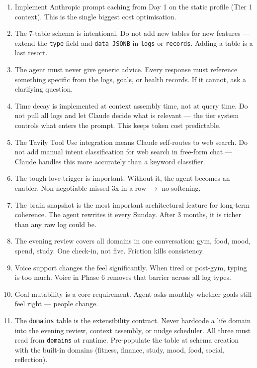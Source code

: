 \documentclass[12pt, a4paper]{article}
\begin{document}
\begin{enumerate}
    \item Implement Anthropic prompt caching from Day 1 on the static profile (Tier 1 context). This is the single biggest cost optimisation.
    \item The 7-table schema is intentional. Do not add new tables for new features --- extend the \texttt{type} field and \texttt{data JSONB} in \texttt{logs} or \texttt{records}. Adding a table is a last resort.
    \item The agent must never give generic advice. Every response must reference something specific from the logs, goals, or health records. If it cannot, ask a clarifying question.
    \item Time decay is implemented at context assembly time, not at query time. Do not pull all logs and let Claude decide what is relevant --- the tier system controls what enters the prompt. This keeps token cost predictable.
    \item The Tavily Tool Use integration means Claude self-routes to web search. Do not add manual intent classification for web search in free-form chat --- Claude handles this more accurately than a keyword classifier.
    \item The tough-love trigger is important. Without it, the agent becomes an enabler. Non-negotiable missed 3x in a row $\rightarrow$ no softening.
    \item The brain snapshot is the most important architectural feature for long-term coherence. The agent rewrites it every Sunday. After 3 months, it is richer than any raw log could be.
    \item The evening review covers all domains in one conversation: gym, food, mood, spend, study. One check-in, not five. Friction kills consistency.
    \item Voice support changes the feel significantly. When tired or post-gym, typing is too much. Voice in Phase 6 removes that barrier across all log types.
    \item Goal mutability is a core requirement. Agent asks monthly whether goals still feel right --- people change.
    \item The \texttt{domains} table is the extensibility contract. Never hardcode a life domain into the evening review, context assembly, or nudge scheduler. All three must read from \texttt{domains} at runtime. Pre-populate the table at schema creation with the built-in domains (fitness, finance, study, mood, food, social, reflection).

\end{enumerate}
\end{document}
